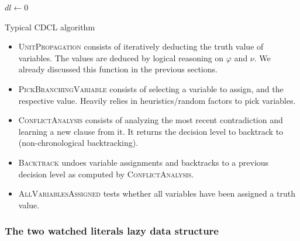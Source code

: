 \documentclass[12pt]{diicc}
\begin{document}
\begin{algorithm}
$dl \leftarrow 0$\\
\caption{Typical CDCL algorithm\label{cdcl}}
\end{algorithm}

\begin{itemize}
	\item \textsc{UnitPropagation} consists of iteratively deducting the truth value of variables. The values are deduced by logical reasoning on $\varphi$ and $\nu$. We already discussed this function in the previous sections.
	\item \textsc{PickBranchingVariable} consists of selecting a variable to assign, and the respective value. Heavily relies in heuristics/random factors to pick variables.
	\item \textsc{ConflictAnalysis} consists of analyzing the most recent contradiction and learning a new clause from it. It returns the decision level to backtrack to (non-chronological backtracking).
	\item \textsc{Backtrack} undoes variable assignments and backtracks to a previous decision level as computed by \textsc{ConflictAnalysis}.
	\item \textsc{AllVariablesAssigned} tests whether all variables have been assigned a truth value.
\end{itemize}


\subsubsection{The two watched literals lazy data structure}
\end{document}
